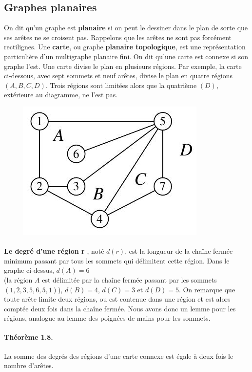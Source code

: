 \subsection{Graphes planaires}
On dit qu'un graphe est \textbf{planaire} si on peut le dessiner dans le plan de sorte que ses arêtes
ne se croisent pas. Rappelons que les arêtes ne sont pas forcément rectilignes.
Une \textbf{carte}, ou graphe \textbf{planaire topologique}, est une représentation particulière d'un multigraphe 
planaire fini. On dit qu'une carte est connexe si son graphe l'est. Une carte divise
le plan en plusieurs régions.
Par exemple, la carte ci-dessous, avec sept sommets et neuf arêtes, divise le plan en quatre
régions $(A, B,C, D)$. Trois régions sont limitées alors que la quatrième $(D)$, extérieure au
diagramme, ne l'est pas.

\begin{figure}[h]
\centering
\includegraphics[width=0.4\linewidth]{images/graph10}
\label{fig:graph10}
\end{figure}
\paragraph*{}
\textbf{Le degré d'une région r} , noté $ d(r) $, est la longueur de la chaîne fermée minimum passant 
par tous les sommets qui délimitent cette région. Dans le graphe ci-dessus, $ d(A) = 6 $\\
(la région $ A $ est délimitée par la chaîne fermée passant par les sommets $ (1, 2, 3, 5, 6, 5, 1) $),
$ d(B) = 4 $, $ d(C) = 3 $ et $ d(D) = 5 $.
On remarque que toute arête limite deux régions, ou est contenue dans une région et est
alors comptée deux fois dans la chaîne fermée. Nous avons donc un lemme pour les régions,
analogue au lemme des poignées de mains pour les sommets.

\paragraph*{Théorème 1.8.} La somme des degrés des régions d'une carte connexe est 
égale à deux fois le nombre d'arêtes.

